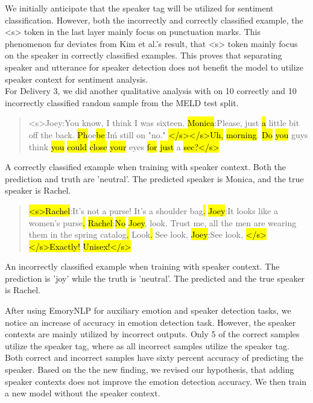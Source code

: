 \documentclass[11pt]{article}
\begin{document}
We initially anticipate that the speaker tag will be utilized for sentiment classification. However, both the incorrectly and correctly classified example, the <s> token in the last layer mainly focus on punctuation marks. This phenomenon far deviates from Kim et al.'s result, that <s> token mainly focus on the speaker in correctly classified examples. This proves that separating speaker and utterance for speaker detection does not benefit the model to utilize speaker context for sentiment analysis.\\

For Delivery 3, we did another qualitative analysis with on 10 correctly and 10 incorrectly classified random sample from the MELD test split.

{\small
\begin{quote}

<s>Joey:You know, I think I was sixteen. \hl{Monica}:Please, just \hl{a} little bit off the back. \hl{Ph}oe\hl{be}:I\'m still on "no." \hl{</s></s>Uh,} \hl{morning}. \hl{Do} \hl{you} guys think \hl{you} \hl{could} \hl{close} \hl{your} eyes \hl{for} \hl{just} a \hl{sec}\hl{?</s>}

\end{quote}

A correctly classified example when training with speaker context. Both the prediction and truth are 'neutral'. The predicted speaker is Monica, and the true speaker is Rachel.

\begin{quote}

\hl{<s>}\hl{Rachel}:It's not a purse! It's a shoulder bag\hl{.} \hl{Joey}:It looks like a women's purse\hl{.} \hl{Rachel}:\hl{No} \hl{Joey}, look. Trust me, all the men are wearing them in the spring catalog\hl{.} Look\hl{.} See look, \hl{Joey}:See look, \hl{</s></s>Exactly!} \hl{Unisex!</s>}

\end{quote}

An incorrectly classified example when training with speaker context. The prediction is 'joy' while the truth is 'neutral'. The predicted and the true speaker is Rachel.}

After using EmoryNLP for auxiliary emotion and speaker detection tasks, we notice an increase of accuracy in emotion detection task. However, the speaker contexts are mainly utilized by incorrect outputs. Only 5 of the correct samples utilize the speaker tag, where as all incorrect samples utilize the speaker tag. Both correct and incorrect samples have sixty percent accuracy of predicting the speaker. Based on the the new finding, we revised our hypothesis, that adding speaker contexts does not improve the emotion detection accuracy. We then train a new model without the speaker context.
\end{document}
